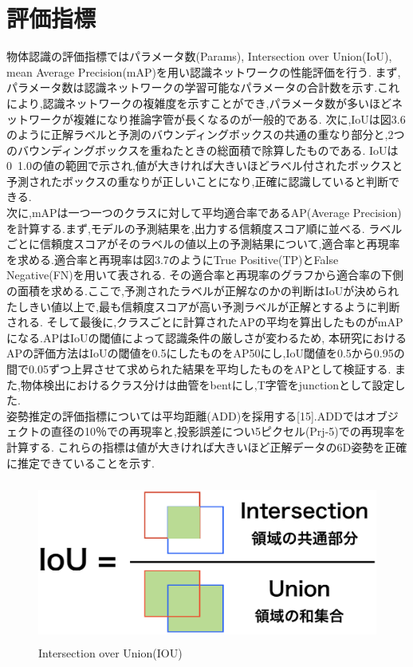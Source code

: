 \section{評価指標}
物体認識の評価指標ではパラメータ数(Params), Intersection over Union(IoU), mean Average Precision(mAP)を用い認識ネットワークの性能評価を行う.
まず,パラメータ数は認識ネットワークの学習可能なパラメータの合計数を示す.これにより,認識ネットワークの複雑度を示すことができ,パラメータ数が多いほどネットワークが複雑になり推論字管が長くなるのが一般的である.
次に,IoUは図3.6のように正解ラベルと予測のバウンディングボックスの共通の重なり部分と,2つのバウンディングボックスを重ねたときの総面積で除算したものである.
IoUは0~1.0の値の範囲で示され,値が大きければ大きいほどラベル付されたボックスと予測されたボックスの重なりが正しいことになり,正確に認識していると判断できる.\\
次に,mAPは一つ一つのクラスに対して平均適合率であるAP(Average Precision)を計算する.まず,モデルの予測結果を,出力する信頼度スコア順に並べる.
ラベルごとに信頼度スコアがそのラベルの値以上の予測結果について,適合率と再現率を求める.適合率と再現率は図3.7のようにTrue Positive(TP)とFalse Negative(FN)を用いて表される.
その適合率と再現率のグラフから適合率の下側の面積を求める.ここで,予測されたラベルが正解なのかの判断はIoUが決められたしきい値以上で,最も信頼度スコアが高い予測ラベルが正解とするように判断される.
そして最後に,クラスごとに計算されたAPの平均を算出したものがmAPになる.APはIoUの閾値によって認識条件の厳しさが変わるため,
本研究におけるAPの評価方法はIoUの閾値を0.5にしたものをAP50にし,IoU閾値を0.5から0.95の間で0.05ずつ上昇させて求められた結果を平均したものをAPとして検証する.
また,物体検出におけるクラス分けは曲管をbentにし,T字管をjunctionとして設定した.\\
姿勢推定の評価指標については平均距離(ADD)を採用する[15].ADDではオブジェクトの直径の10％での再現率と,投影誤差につい5ピクセル(Prj-5)での再現率を計算する.
これらの指標は値が大きければ大きいほど正解データの6D姿勢を正確に推定できていることを示す.


\begin{figure}[htbt]
	\centering
	 \includegraphics[height=53mm]{iou.eps}
	 \caption{Intersection over Union(IOU)}
	 \label{fig:f2}
\end{figure}

